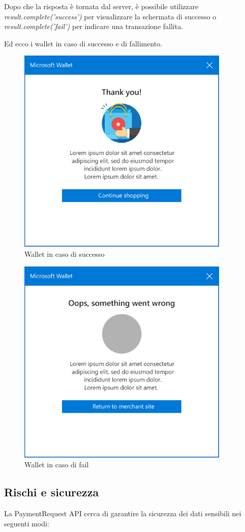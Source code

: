 \documentclass[11pt ,a4paper , twoside , openright ]{article}
\begin{document}
Dopo che la risposta è tornata dal server, è possibile utilizzare \textit{result.complete('success')} per visualizzare la schermata di successo o \textit{result.complete('fail')} per indicare una transazione fallita.

\pagebreak
Ed ecco i wallet in caso di successo e di fallimento.
\begin{figure}[h]
	\centering
	\includegraphics[width=0.5\linewidth]{wallet2}
	\caption{Wallet in caso di successo}
	\label{fig: Wallet in caso di successo}
\end{figure}
\begin{figure}[h]
	\centering
	\includegraphics[width=0.5\linewidth]{wallet3}
	\caption{Wallet in caso di fail}
	\label{fig: Wallet in caso di fail}
\end{figure}


\subsection{Rischi e sicurezza \cite{rif19}} 
La PaymentRequest API cerca di garantire la sicurezza dei dati sensibili nei seguenti modi:
\end{document}
